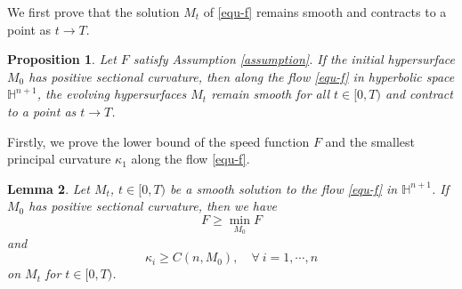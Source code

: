 \documentclass[11pt,reqno]{amsart}
\newtheorem{proposition}{Proposition}[section]
\newtheorem{lemma}[proposition]{Lemma}
\theoremstyle{remark}
\numberwithin{equation}{section}
\begin{document}
We first prove that the solution $M_t$ of \eqref{equ-f} remains smooth and contracts to a point as $t\to T$.

\begin{proposition} \label{lem-point}
Let $F$ satisfy Assumption \ref{assumption}. If the initial hypersurface $M_0$ has positive sectional curvature, then along the flow \eqref{equ-f} in hyperbolic space $\mathbb{H}^{n+1}$, the evolving hypersurfaces $M_t$ remain smooth for all $t\in[0,T)$ and contract to a point as $t\to T$.
\end{proposition}
	

Firstly, we prove the lower bound of the speed function $F$ and the smallest principal curvature $\kappa_1$ along the flow \eqref{equ-f}.
\begin{lemma}
	Let $M_t$, $t\in[0,T)$ be a smooth solution to the flow \eqref{equ-f} in $\mathbb{H}^{n+1}$. If $M_0$ has positive sectional curvature, then we have
	\begin{equation}
		\label{equ-psilbd}
		F\geq \min\limits_{M_0}F
	\end{equation}
    and
    \begin{equation}
    	\label{equ-k1low}
    	\kappa_i \geq C(n,M_0),\quad \forall~i=1,\cdots,n
    \end{equation}
    on $M_t$ for $t\in[0,T)$.
\end{lemma}
\end{document}
